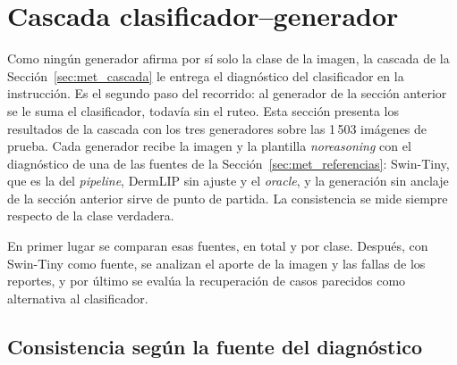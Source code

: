 \section{Cascada clasificador--generador}
\label{sec:res_gen_cascada}

Como ningún generador afirma por sí solo la clase de la imagen, la cascada de la Sección~\ref{sec:met_cascada} le
entrega el diagnóstico del clasificador en la instrucción. Es el segundo paso del recorrido: al generador de la
sección anterior se le suma el clasificador, todavía sin el ruteo. Esta sección presenta los resultados de la cascada
con los tres generadores sobre las 1\,503 imágenes de prueba. Cada generador recibe la imagen y la plantilla
\emph{noreasoning} con el diagnóstico de una de las fuentes de la Sección~\ref{sec:met_referencias}: Swin-Tiny, que es
la del \emph{pipeline}, DermLIP sin ajuste y el \emph{oracle}, y la generación sin anclaje de la sección anterior sirve
de punto de partida. La consistencia se mide siempre respecto de la clase verdadera.

En primer lugar se comparan esas fuentes, en total y por clase. Después, con Swin-Tiny como fuente, se analizan el
aporte de la imagen y las fallas de los reportes, y por último se evalúa la recuperación de casos parecidos como
alternativa al clasificador.

\subsection{Consistencia según la fuente del diagnóstico}
\label{sec:res_gen_fuentes}


